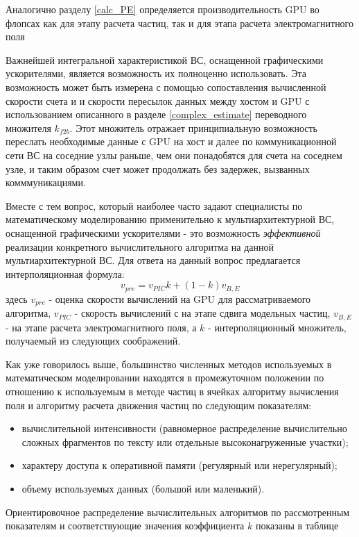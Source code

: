 Аналогично разделу \ref{calc_PE} определяется производительность GPU во флопсах как для этапу расчета частиц, так и для этапа расчета электромагнитного поля

Важнейшей интегральной характеристикой ВС, оснащенной графическими ускорителями, является возможность их полноценно использовать. Эта возможность
может быть измерена с помощью сопоставления вычисленной скорости счета и и скорости пересылок данных между хостом и GPU с использованием описанного 
в разделе \ref{complex_estimate} переводного множителя $k_{f2b}$. Этот множитель отражает принципиальную возможность переслать необходимые данные с GPU на хост и далее по коммуникационной сети ВС на соседние узлы раньше, чем они понадобятся для счета на соседнем узле, и таким образом счет может продолжать без задержек, вызванных комммуникациями.

Вместе с тем вопрос, который наиболее часто задают специалисты по математическому моделированию применительно к мультиархитектурной ВС, оснащенной графическими ускорителями - это возможность \textit{эффективной} реализации конкретного вычислительного алгоритма на данной мультиархитектурной ВС.
Для ответа на данный вопрос предлагается интерполяционная формула:
\begin{equation}
v_{pre} = v_{PIC} k + (1-k) v_{B,E}
\end{equation} 
здесь $ v_{pre}$ - оценка скорости вычислений на GPU для рассматриваемого алгоритма, $v_{PIC}$ - скорость вычислений с на этапе сдвига модельных частиц, $v_{B,E}$ - на этапе расчета электромагнитного поля, а $k$ - интерполяционный множитель, получаемый из следующих соображений.

Как уже говорилось выше, большинство численных методов используемых в математическом моделировании находятся в промежуточном положении по отношению к используемым в методе частиц в ячейках алгоритму вычисления поля и алгоритму расчета движения частиц по следующим показателям:
\begin{itemize}
	\item вычислительной интенсивности (равномерное распределение вычислительно сложных фрагментов по тексту или отдельные высоконагруженные участки);
	\item характеру доступа к оперативной памяти (регулярный или нерегулярный);
	\item объему используемых данных (большой или маленький).
\end{itemize}
Ориентировочное распределение вычислительных алгоритмов по рассмотренным показателям и соответствующие значения коэффициента $k$ показаны в таблице 


